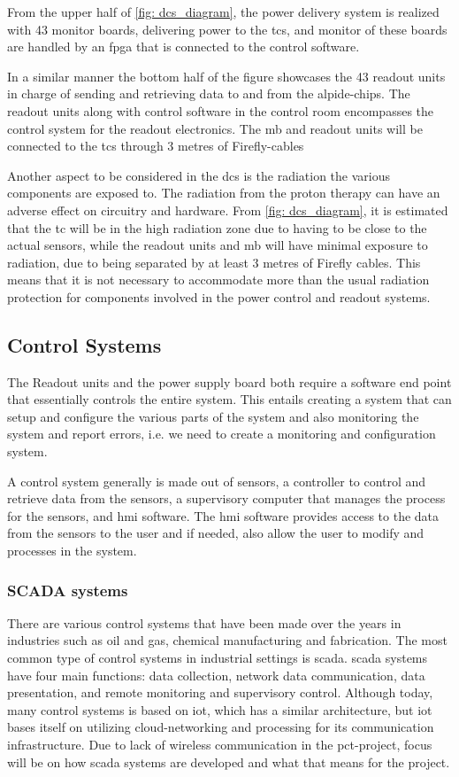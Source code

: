 \documentclass[main.tex]{subfiles}
\begin{document}
From the upper half of \autoref{fig: dcs_diagram}, the power delivery system is realized with 43 monitor boards, delivering power to the \gls{tc}s, and monitor of these boards are handled by an \gls{fpga} that is connected to the control software.

In a similar manner the bottom half of the figure showcases the 43 readout units in charge of sending and retrieving data to and from the \gls{alpide}-chips. The readout units along with control software in the control room encompasses the control system for the readout electronics. The \gls{mb} and readout units will be connected to the \gls{tc}s through 3 metres of Firefly-cables 

Another aspect to be considered in the \gls{dcs} is the radiation the various components are exposed to. The radiation from the proton therapy can have an adverse effect on circuitry and hardware. From \autoref{fig: dcs_diagram}, it is estimated that the \gls{tc} will be in the high radiation zone due to having to be close to the actual sensors, while the readout units and \gls{mb} will have minimal exposure to radiation, due to being separated by at least 3 metres of Firefly cables. This means that it is not necessary to accommodate more than the usual radiation protection for components involved in the power control and readout systems.


\subsection{Control Systems}

The Readout units and the power supply board both require a software end point that essentially controls the entire system. This entails creating a system that can setup and configure the various parts of the system and also monitoring the system and report errors, i.e. we need to create a monitoring and configuration system.

A control system generally is made out of sensors, a controller to control and retrieve data from the sensors, a supervisory computer that manages the process for the sensors, and \gls{hmi} software. The \gls{hmi} software provides access to the data from the sensors to the user and if needed, also allow the user to modify and processes in the system.


\subsubsection{SCADA systems}
There are various control systems that have been made over the years in industries such as oil and gas, chemical manufacturing and fabrication. The most common type of control systems in industrial settings is \gls{scada}. \gls{scada} systems have four main functions: data collection, network data communication, data presentation, and remote monitoring and supervisory control\cite{scada_intro}. Although today, many control systems is based on \gls{iot}, which has a similar architecture, but \gls{iot} bases itself on utilizing cloud-networking and processing for its communication infrastructure. Due to lack of wireless communication in the \gls{pct}-project, focus will be on how \gls{scada} systems are developed and what that means for the project.
\end{document}
